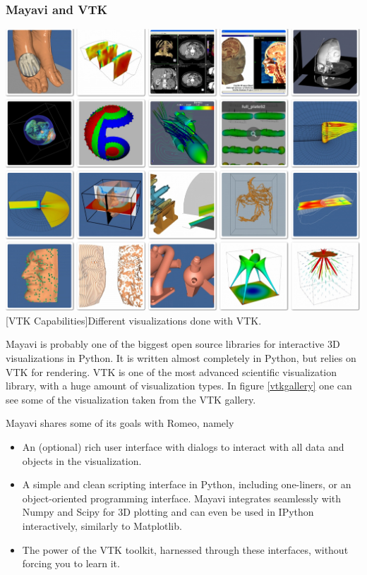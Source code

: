\subsubsection{Mayavi and VTK}
\vspace{1em}
\begin{minipage}{\linewidth}
    \centering
    \includegraphics[width=0.9\linewidth]{graphics/vtk.jpg}
    [VTK Capabilities]{Different visualizations done with VTK.}
    \label{fig:vtkgallery}
\end{minipage}

Mayavi\cite{DBLP:journals/corr/abs-1010-4891} is probably one of the biggest open source libraries for interactive 3D visualizations in Python.
It is written almost completely in Python, but relies on \ac{VTK} for rendering.
\ac{VTK} is one of the most advanced scientific visualization library, with a huge amount of visualization types. 
In figure \cref{vtkgallery} one can see some of the visualization taken from the \ac{VTK} gallery\cite{VTKGallery}.

Mayavi shares some of its goals with Romeo, namely\cite{MayaviGoals}
\begin{itemize}
	\item An (optional) rich user interface with dialogs to interact with all data and objects in the visualization.
	\item A simple and clean scripting interface in Python, including one-liners, or an object-oriented programming interface. Mayavi integrates seamlessly with Numpy and Scipy for 3D plotting and can even be used in IPython interactively, similarly to Matplotlib.
	\item The power of the VTK toolkit, harnessed through these interfaces, without forcing you to learn it.
\end{itemize}

